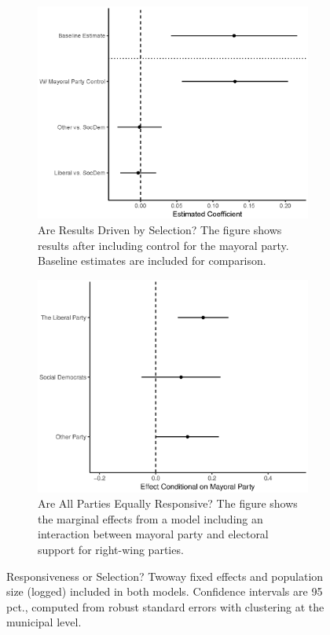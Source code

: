 \documentclass[a4paper,12pt]{article}
\begin{document}
\begin{figure}[!htb]
	\begin{subfigure}{0.45\textwidth}
		\includegraphics[width=1\textwidth]{PostTreatControl.eps}
		\caption{Are Results Driven by Selection? The figure shows results after including control for the mayoral party. Baseline estimates are included for comparison.} \label{mech}
	\end{subfigure}  \hfill
	\begin{subfigure}{0.45\textwidth}
		\includegraphics[width=1\textwidth]{MargFX_31082018.eps}
		\caption{Are All Parties Equally Responsive? The figure shows the marginal effects from a model including an interaction between mayoral party and electoral support for right-wing parties.} \label{inter}
	\end{subfigure}
	\caption{Responsiveness or Selection? Twoway fixed effects and population size (logged) included in both models. Confidence intervals are 95 pct., computed from robust standard errors with clustering at the municipal level.}
	\label{fig:mech}
\end{figure}
\end{document}
